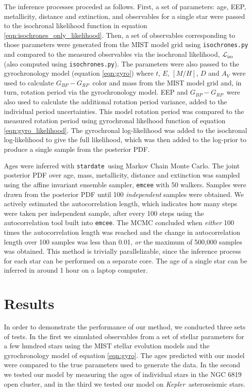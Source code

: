 \documentclass[useAMS, usenatbib, preprint, 12pt]{aastex}
\newcommand{\kepler}{{\it Kepler}}
\newcommand{\sd}{{\tt stardate}}
\newcommand{\gcolor}{$G_{BP} - G_{RP}$}
\begin{document}
The inference processes proceded as follows.
First, a set of parameters: age, EEP, metallicity, distance and extinction,
and observables for a single star were passed to the isochronal likelihood
function in equation \eqref{eqn:isochrones_only_likelihood}.
Then, a set of observables corresponding to those parameters were generated
from the MIST model grid using {\tt isochrones.py} \citep{isochrones} and
compared to the measured observables via the isochronal likelihood,
$\mathcal{L}_{\mathrm{iso}}$ (also computed using {\tt isochrones.py}).
The parameters were also passed to the gyrochronology model (equation
\ref{eqn:gyro}) where $t$, $E$,
$[M/H]$, $D$ and $A_V$ were used to calculate \gcolor\ color and mass from the
MIST model grid and, in turn, rotation period via the gyrochronology model.
EEP and \gcolor\ were also used to calculate the additional rotation period
variance, added to the individual period uncertainties.
This model rotation period was compared to the measured rotation period using
gyrochronal likelhood function of equation \ref{eqn:gyro_likelihood}.
The gyrochronal log-likelihood was added to the isochronal log-likelihood to
give the full likelihood, which was then added to the log-prior to produce a
single sample from the posterior PDF.

Ages were inferred with \sd\ using Markov Chain Monte Carlo.
The joint posterior PDF over age, mass, metallicity, distance and extinction
was sampled using the affine invariant ensemble sampler, {\tt emcee}
\citep{foreman-mackey2013} with 50 walkers.
Samples were drawn from the posterior PDF until 100 {\it independent} samples
were obtained.
We actively estimated the autocorrelation length, which indicates how many
steps were taken per independent sample, after every 100 steps using the
autocorrelation tool built into {\tt emcee}.
The MCMC concluded when {\it either} 100 times the autocorrelation length was
reached and the change in autocorrelation length over 100 samples was less
than 0.01, {\it or} the maximum of 500,000 samples was obtained.
This method is trivially parallelizable, since the inference process for each
star can be performed on a separate core.
The age of a single star can be inferred in around 1 hour on a laptop
computer.

\section{Results}
\label{section:results}

In order to demonstrate the performance of our method, we conducted three sets
of tests.
In the first we simulated observables from a set of stellar parameters for a
few hundred stars using the MIST stellar evolution models and the
gyrochronology model of equation \ref{eqn:gyro}.
The ages predicted with our model were compared to the true parameters used to
generate the data.
In the second we tested our model by measuring the ages of individual stars in
the NGC 6819 open cluster, and in the third we tested our model on \kepler\
asteroseismic stars.
\end{document}
